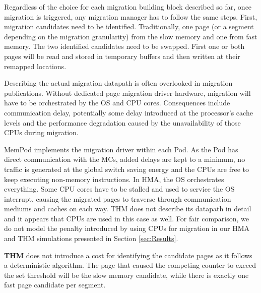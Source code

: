 Regardless of the choice for each migration building block described so far, once migration is triggered, any migration manager has to follow the same steps. First, migration candidates need to be identified. Traditionally, one page (or a segment depending on the migration granularity) from the slow memory and one from fast memory. The two identified candidates need to be swapped. First one or both pages will be read and stored in temporary buffers and then written at their remapped locations.

Describing the actual migration datapath is often overlooked in migration publications. Without dedicated page migration driver hardware, migration will have to be orchestrated by the OS and CPU cores. Consequences include communication delay, potentially some delay introduced at the processor's cache levels and the performance degradation caused by the unavailability of those CPUs during migration. 

MemPod implements the migration driver within each Pod. As the Pod has direct communication with the MCs, added delays are kept to a minimum, no traffic is generated at the global switch saving energy and the CPUs are free to keep executing non-memory instructions. In HMA, the OS orchestrates everything. Some CPU cores have to be stalled and used to service the OS interrupt, causing the migrated pages to traverse through communication mediums and caches on each way. THM does not describe its datapath in detail and it appears that CPUs are used in this case as well. For fair comparison, we do not model the penalty introduced by using CPUs for migration in our HMA and THM simulations presented in Section \ref{sec:Results}.


	\textbf{THM} does not introduce a cost for identifying the candidate pages as it follows a deterministic algorithm. The page that caused the competing counter to exceed the set threshold will be the slow memory candidate, while there is exactly one fast page candidate per segment.

